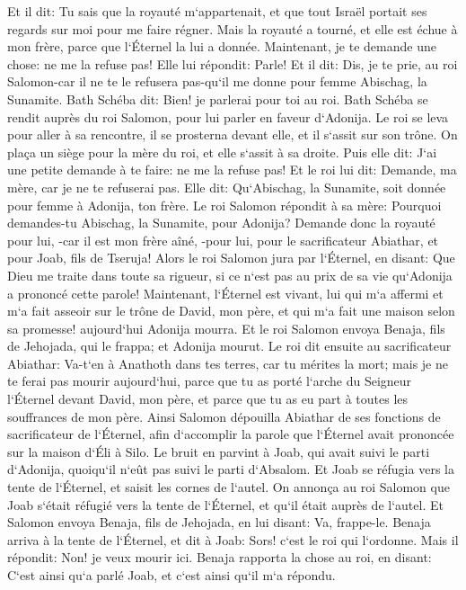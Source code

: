 \verse Et il dit: Tu sais que la royauté m`appartenait, et que tout Israël portait ses regards sur moi pour me faire régner. Mais la royauté a tourné, et elle est échue à mon frère, parce que l`Éternel la lui a donnée. 
\verse Maintenant, je te demande une chose: ne me la refuse pas! Elle lui répondit: Parle! 
\verse Et il dit: Dis, je te prie, au roi Salomon-car il ne te le refusera pas-qu`il me donne pour femme Abischag, la Sunamite. 
\verse Bath Schéba dit: Bien! je parlerai pour toi au roi. 
\verse Bath Schéba se rendit auprès du roi Salomon, pour lui parler en faveur d`Adonija. Le roi se leva pour aller à sa rencontre, il se prosterna devant elle, et il s`assit sur son trône. On plaça un siège pour la mère du roi, et elle s`assit à sa droite. 
\verse Puis elle dit: J`ai une petite demande à te faire: ne me la refuse pas! Et le roi lui dit: Demande, ma mère, car je ne te refuserai pas. 
\verse Elle dit: Qu`Abischag, la Sunamite, soit donnée pour femme à Adonija, ton frère. 
\verse Le roi Salomon répondit à sa mère: Pourquoi demandes-tu Abischag, la Sunamite, pour Adonija? Demande donc la royauté pour lui, -car il est mon frère aîné, -pour lui, pour le sacrificateur Abiathar, et pour Joab, fils de Tseruja! 
\verse Alors le roi Salomon jura par l`Éternel, en disant: Que Dieu me traite dans toute sa rigueur, si ce n`est pas au prix de sa vie qu`Adonija a prononcé cette parole! 
\verse Maintenant, l`Éternel est vivant, lui qui m`a affermi et m`a fait asseoir sur le trône de David, mon père, et qui m`a fait une maison selon sa promesse! aujourd`hui Adonija mourra. 
\verse Et le roi Salomon envoya Benaja, fils de Jehojada, qui le frappa; et Adonija mourut. 
\verse Le roi dit ensuite au sacrificateur Abiathar: Va-t`en à Anathoth dans tes terres, car tu mérites la mort; mais je ne te ferai pas mourir aujourd`hui, parce que tu as porté l`arche du Seigneur l`Éternel devant David, mon père, et parce que tu as eu part à toutes les souffrances de mon père. 
\verse Ainsi Salomon dépouilla Abiathar de ses fonctions de sacrificateur de l`Éternel, afin d`accomplir la parole que l`Éternel avait prononcée sur la maison d`Éli à Silo. 
\verse Le bruit en parvint à Joab, qui avait suivi le parti d`Adonija, quoiqu`il n`eût pas suivi le parti d`Absalom. Et Joab se réfugia vers la tente de l`Éternel, et saisit les cornes de l`autel. 
\verse On annonça au roi Salomon que Joab s`était réfugié vers la tente de l`Éternel, et qu`il était auprès de l`autel. Et Salomon envoya Benaja, fils de Jehojada, en lui disant: Va, frappe-le. 
\verse Benaja arriva à la tente de l`Éternel, et dit à Joab: Sors! c`est le roi qui l`ordonne. Mais il répondit: Non! je veux mourir ici. Benaja rapporta la chose au roi, en disant: C`est ainsi qu`a parlé Joab, et c`est ainsi qu`il m`a répondu. 
